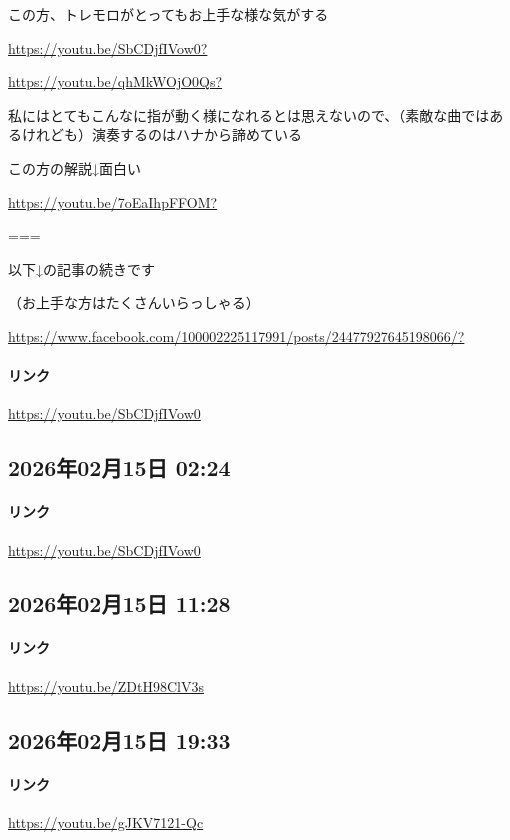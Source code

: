 この方、トレモロがとってもお上手な様な気がする

\url{https://youtu.be/SbCDjfIVow0?}

\url{https://youtu.be/qhMkWOjO0Qs?}

私にはとてもこんなに指が動く様になれるとは思えないので、（素敵な曲ではあるけれども）演奏するのはハナから諦めている

この方の解説↓面白い

\url{https://youtu.be/7oEaIhpFFOM?}

===

以下↓の記事の続きです

（お上手な方はたくさんいらっしゃる）

\url{https://www.facebook.com/100002225117991/posts/24477927645198066/?}

\paragraph{リンク}
\url{https://youtu.be/SbCDjfIVow0}

\subsection*{2026年02月15日 02:24}

\paragraph{リンク}
\url{https://youtu.be/SbCDjfIVow0}

\subsection*{2026年02月15日 11:28}

\paragraph{リンク}
\url{https://youtu.be/ZDtH98ClV3s}

\subsection*{2026年02月15日 19:33}

\paragraph{リンク}
\url{https://youtu.be/gJKV7121-Qc}

